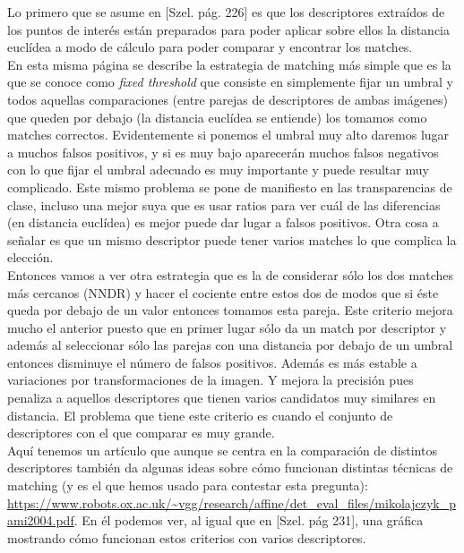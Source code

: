 \documentclass[10pt,a4paper]{article}
\begin{document}
Lo primero que se asume en [Szel. pág. 226] es que los descriptores extraídos de los puntos de interés están preparados para poder aplicar sobre ellos la distancia euclídea a modo de cálculo para poder comparar y encontrar los matches.\\

En esta misma página se describe la estrategia de matching más simple que es la que se conoce como \textit{fixed threshold} que consiste en simplemente fijar un umbral y todos aquellas comparaciones (entre parejas de descriptores de ambas imágenes) que queden por debajo (la distancia euclídea se entiende) los tomamos como matches correctos. Evidentemente si ponemos el umbral muy alto daremos lugar a muchos falsos positivos, y si es muy bajo aparecerán muchos falsos negativos con lo que fijar el umbral adecuado es muy importante y puede resultar muy complicado. Este mismo problema se pone de manifiesto en las transparencias de clase, incluso una mejor suya que es usar ratios para ver cuál de las diferencias (en distancia euclídea) es mejor puede dar lugar a falsos positivos. Otra cosa a señalar es que un mismo descriptor puede tener varios matches lo que complica la elección.\\

Entonces vamos a ver otra estrategia que es la de considerar sólo los dos matches más cercanos (NNDR) y hacer el cociente entre estos dos de modos que si éste queda por debajo de un valor entonces tomamos esta pareja. Este criterio mejora mucho el anterior puesto que en primer lugar sólo da un match por descriptor y además al seleccionar sólo las parejas con una distancia por debajo de un umbral entonces disminuye el número de falsos positivos. Además es más estable a variaciones por transformaciones de la imagen. Y mejora la precisión pues penaliza a aquellos descriptores que tienen varios candidatos muy similares en distancia. El problema que tiene este criterio es cuando el conjunto de descriptores con el que comparar es muy grande.\\

Aquí tenemos un artículo que aunque se centra en la comparación de distintos descriptores también da algunas ideas sobre cómo funcionan distintas técnicas de matching (y es el que hemos usado para contestar esta pregunta): \url{https://www.robots.ox.ac.uk/~vgg/research/affine/det_eval_files/mikolajczyk_pami2004.pdf}. En él podemos ver, al igual que en [Szel. pág 231], una gráfica mostrando cómo funcionan estos criterios con varios descriptores.\\
\end{document}
